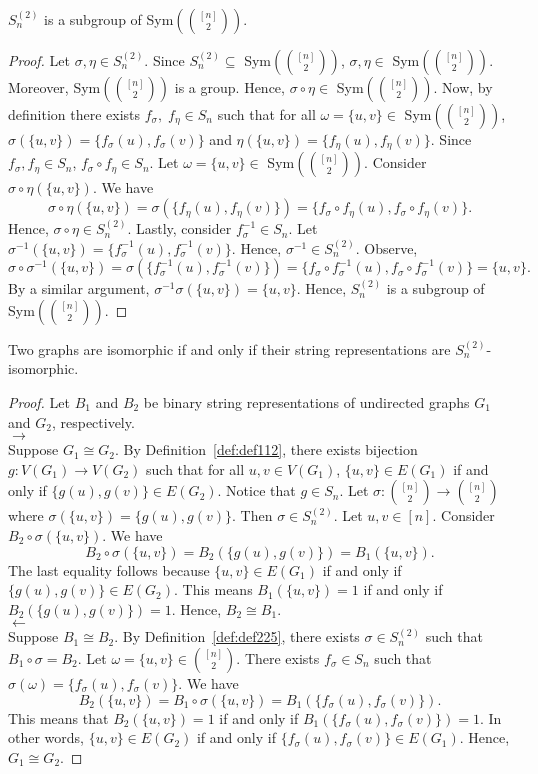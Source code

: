 \begin{lemma}
$S_n^{(2)}$ is a subgroup of Sym$({[n]\choose 2})$. 
\end{lemma}
\begin{proof}
Let $\sigma,\eta\in S_n^{(2)}$. Since $S_n^{(2)}\subseteq$ Sym$\left({[n]\choose 2}\right)$, $\sigma,\eta\in$ Sym$\left({[n]\choose 2}\right)$. Moreover, Sym$\left({[n]\choose 2}\right)$ is a group. Hence, $\sigma\circ\eta\in$ Sym$\left({[n]\choose 2}\right)$. Now, by definition there exists $f_\sigma,\;f_\eta\in S_n$ such that for all $\omega=\{u,v\}\in$ Sym$({[n]\choose 2})$, $\sigma(\{u,v\})=\{f_\sigma(u),f_\sigma(v)\}$ and $\eta(\{u,v\})=\{f_\eta(u),f_\eta(v)\}.$ Since $f_\sigma,f_\eta\in S_n$, $f_\sigma\circ f_\eta\in S_n$. Let $\omega=\{u,v\}\in$ Sym$({[n]\choose 2})$. Consider $\sigma\circ\eta(\{u,v\})$. We have
\[\sigma\circ\eta(\{u,v\})=\sigma(\{f_\eta(u),f_\eta(v)\})=\{f_\sigma\circ f_\eta(u),f_\sigma\circ f_\eta(v)\}.\] 
Hence, $\sigma\circ\eta\in S_n^{(2)}$. Lastly, consider $f_\sigma^{-1}\in S_n$. Let $\sigma^{-1}(\{u,v\})=\{f_\sigma^{-1}(u),f_\sigma^{-1}(v)\}$. Hence, $\sigma^{-1}\in S_n^{(2)}$. Observe,
\[\sigma\circ\sigma^{-1}(\{u,v\})=\sigma(\{f_\sigma^{-1}(u),f_\sigma^{-1}(v)\})=\{f_\sigma\circ f_\sigma^{-1}(u),f_\sigma\circ f_\sigma^{-1}(v)\}=\{u,v\}.\] By a similar argument, $\sigma^{-1}\sigma(\{u,v\})=\{u,v\}$. Hence, $S_n^{(2)}$ is a subgroup of Sym$({[n]\choose 2})$.
\end{proof}
\begin{lemma}
Two graphs are isomorphic if and only if their string representations are $S_n^{(2)}$-isomorphic.
\end{lemma}
\begin{proof}
Let $B_1$ and $B_2$ be binary string representations of undirected graphs $G_1$ and $G_2$, respectively. \\
$\rightarrow$\\
Suppose $G_1\cong G_2$. By Definition~\ref{def:def112}, there exists bijection $g:V(G_1)\rightarrow V(G_2)$ such that for all $u,v\in V(G_1)$, $\{u,v\}\in E(G_1)$ if and only if $\{g(u),g(v)\}\in E(G_2)$. Notice that $g\in S_n$. Let $\sigma:{[n]\choose 2}\rightarrow {[n]\choose 2}$ where $\sigma(\{u,v\})=\{g(u),g(v)\}$. Then $\sigma\in S_n^{(2)}$. Let $u,v\in [n]$. Consider $B_2\circ\sigma(\{u,v\})$. We have
\[B_2\circ\sigma(\{u,v\})=B_2(\{g(u),g(v)\})=B_1(\{u,v\}).\] The last equality follows because $\{u,v\}\in E(G_1)$ if and only if $\{g(u),g(v)\}\in E(G_2)$. This means  $B_1(\{u,v\})=1$ if and only if $B_2(\{g(u),g(v)\})=1$. Hence, $B_2\cong B_1$.\\
$\leftarrow$\\
Suppose $B_1\cong B_2$. By Definition~\ref{def:def225}, there exists $\sigma\in S_n^{(2)}$ such that $B_1\circ \sigma=B_2$. Let $\omega=\{u,v\}\in{[n]\choose 2}$. There exists $f_\sigma\in S_n$ such that $\sigma(\omega)=\{f_\sigma(u),f_\sigma(v)\}.$ We have
\[B_2(\{u,v\})=B_1\circ \sigma(\{u,v\})=B_1(\{f_\sigma(u),f_\sigma(v)\}).\]
This means that $B_2(\{u,v\})=1$ if and only if $B_1(\{f_\sigma(u),f_\sigma(v)\})=1$. In other words, $\{u,v\}\in E(G_2)$ if and only if $\{f_\sigma(u),f_\sigma(v)\}\in E(G_1)$. Hence, $G_1\cong G_2$. 
\end{proof}


